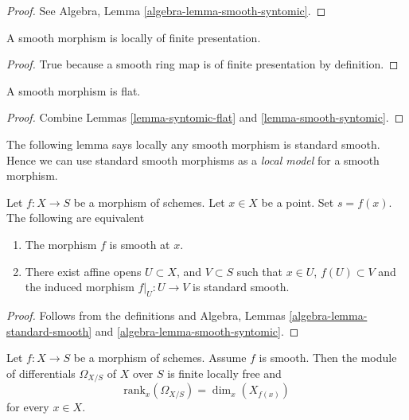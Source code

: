 \begin{proof}
See Algebra, Lemma \ref{algebra-lemma-smooth-syntomic}.
\end{proof}

\begin{lemma}
\label{lemma-smooth-locally-finite-presentation}
A smooth morphism is locally of finite presentation.
\end{lemma}

\begin{proof}
True because a smooth ring map is of finite presentation by
definition.
\end{proof}

\begin{lemma}
\label{lemma-smooth-flat}
A smooth morphism is flat.
\end{lemma}

\begin{proof}
Combine Lemmas \ref{lemma-syntomic-flat} and \ref{lemma-smooth-syntomic}.
\end{proof}

\noindent
The following lemma says locally any smooth morphism is standard smooth.
Hence we can use standard smooth morphisms as a {\it local model}
for a smooth morphism.

\begin{lemma}
\label{lemma-smooth-locally-standard-smooth}
Let $f : X  \to S$ be a morphism of schemes.
Let $x \in X$ be a point.
Set $s = f(x)$.
The following are equivalent
\begin{enumerate}
\item The morphism $f$ is smooth at $x$.
\item There exist affine opens $U \subset X$,
and $V \subset S$ such that $x \in U$, $f(U) \subset V$ and the
induced morphism $f|_U : U \to V$ is standard smooth.
\end{enumerate}
\end{lemma}

\begin{proof}
Follows from the definitions and
Algebra, Lemmas \ref{algebra-lemma-standard-smooth}
and \ref{algebra-lemma-smooth-syntomic}.
\end{proof}

\begin{lemma}
\label{lemma-smooth-omega-finite-locally-free}
Let $f : X \to S$ be a morphism of schemes.
Assume $f$ is smooth.
Then the module of differentials $\Omega_{X/S}$ of $X$ over $S$
is finite locally free and
$$
\text{rank}_x(\Omega_{X/S}) = \dim_x(X_{f(x)})
$$
for every $x \in X$.
\end{lemma}

